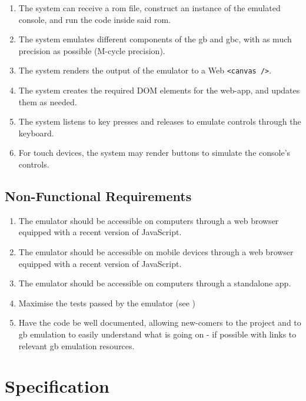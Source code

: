 \documentclass[11pt]{informatics-report}
\begin{document}
\begin{enumerate}[start=1,label=F\arabic*.]
    \item The system can receive a \gls{rom} file, construct an instance of the emulated console, and run the code inside said \gls{rom}.
    \item The system emulates different components of the \gls{gb} and \gls{gbc}, with as much precision as possible (M-cycle precision).
    \item The system renders the output of the emulator to a Web \texttt{<canvas />}.
    \item The system creates the required DOM elements for the web-app, and updates them as needed.
    \item The system listens to key presses and releases to emulate controls through the keyboard.
    \item For touch devices, the system may render buttons to simulate the console's controls.
\end{enumerate}

\subsection{Non-Functional Requirements}

\begin{enumerate}[start=1,label=N\arabic*.]
    \item The emulator should be accessible on computers through a web browser equipped with a recent version of JavaScript.
    \item The emulator should be accessible on mobile devices through a web browser equipped with a recent version of JavaScript.
    \item The emulator should be accessible on computers through a standalone app.
    \item Maximise the tests passed by the emulator (see )
    \item Have the code be well documented, allowing new-comers to the project and to \gls{gb} emulation to easily understand what is going on - if possible with links to relevant \glsdesc{gb} emulation resources.
\end{enumerate}


\section{Specification}
\end{document}
